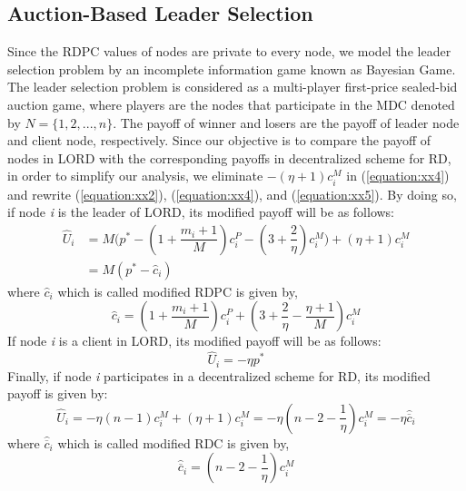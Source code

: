 \documentclass[journal,12pt, onecolumn]{IEEEtran}
\begin{document}
\subsection{Auction-Based Leader Selection}
\label{section:Leader Selection Game}
Since the RDPC values of nodes are private to every node, we model the leader selection problem by an incomplete information game known as Bayesian Game. The leader selection problem is considered as a multi-player first-price sealed-bid auction game, where players are the nodes that participate in the MDC denoted by $N=\{1, 2,..., n\}$. The payoff of winner and losers are the payoff of leader node and client node, respectively. Since our objective is to compare the payoff of nodes in LORD with the corresponding payoffs in decentralized scheme for RD, in order to simplify our analysis, we eliminate $-(\eta+1) c_i ^{M}$ in (\ref{equation:xx4}) and rewrite (\ref{equation:xx2}), (\ref{equation:xx4}), and (\ref{equation:xx5}). By doing so, if node \textit{i} is the leader of LORD, its modified payoff will be as follows: 
\begin{align}
\label{equation:xx222}
\widehat{U}_i &=  M\Big(p^* -(1 + \dfrac{m_i +1}{M})c_i ^{P} - (3+\dfrac{2}{\eta})c_i ^{M}\Big) + (\eta +1) c_i ^M 
\nonumber
\\
&=M(p^* - \widehat{c}_i) 
\end{align}
where $\widehat{c}_i$ which is called modified RDPC is given by,
\begin{equation}
\label{equation:xx2232}
\widehat{c}_i = (1 + \dfrac{m_i +1}{M})c_i ^{P} + (3+\dfrac{2}{\eta} - \dfrac{\eta +1}{M})c_i ^{M}
\end{equation}
If node \textit{i} is a client in LORD, its modified payoff will be as follows:
\begin{equation}
\label{equation:xx223}
\widehat{U}_i =  -\eta p^* 
\end{equation}
Finally, if node \textit{i} participates in a decentralized scheme for RD, its modified payoff is given by:
\begin{equation}
\label{equation:xx224}
\widehat{U}_i =  -\eta (n-1)c_i ^M + (\eta +1) c_i ^M = -\eta (n-2-\dfrac{1}{\eta})c_i^M = -\eta \widehat{\overline{c}}_i
\end{equation}
where $\widehat{\overline{c}}_i$ which is called modified RDC is given by,
\begin{equation}
\label{equation:xx2233}
\widehat{\overline{c}}_i = (n-2-\dfrac{1}{\eta})c_i^M 
\end{equation}
\end{document}
